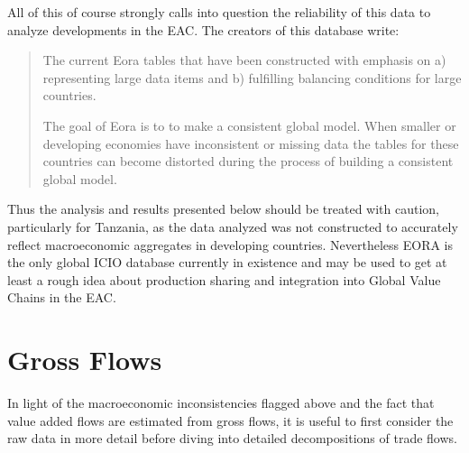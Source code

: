 \documentclass[a4paper]{article}
\begin{document}
All of this of course strongly calls into question the reliability of this data to analyze developments in the EAC. The creators of this database write:

\begin{quote}
The current Eora tables that have been constructed with emphasis on a) representing large data items and b) fulfilling balancing conditions for large countries.

The goal of Eora is to to make a consistent global model. When smaller or developing economies have inconsistent or missing data the tables for these countries can become distorted during the process of building a consistent global model. %
\end{quote}

Thus the analysis and results presented below should be treated with caution, particularly for Tanzania, as the data analyzed was not constructed to accurately reflect macroeconomic aggregates in developing countries. Nevertheless EORA is the only global ICIO database currently in existence and may be used to get at least a rough idea about production sharing and integration into Global Value Chains in the EAC. 

\section{Gross Flows}
In light of the macroeconomic inconsistencies flagged above and the fact that value added flows are estimated from gross flows, it is useful to first consider the raw data in more detail before diving into detailed decompositions of trade flows. 
\end{document}
